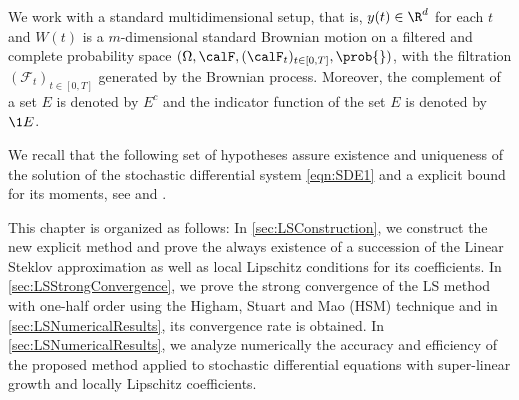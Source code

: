 We work with a standard multidimensional setup, that is,  $y(t)\in \R^d$ for each 
$t$ and  $W(t)$ is a
$m$-dimensional standard Brownian motion on a filtered and complete probability space
$	(
		\Omega ,\calF,(\calF_t)_{t\in[0,T]},\prob{}
	)$,
with the filtration
$(\mathcal{F}_t)_{t\in[0,T]}$  generated by the Brownian process.  Moreover, the complement of a set $E$ is denoted by 
$E^c$ and the indicator function  of the set $E$ is denoted by $\1{E}$. 


We recall that the following set of hypotheses assure existence 
and uniqueness of the solution of the stochastic differential system \eqref{eqn:SDE1} 
and a explicit bound for its moments, see  and .

	

	This chapter is organized as follows: In \cref{sec:LSConstruction}, we construct the new explicit method and prove 
the always existence of a succession of the Linear Steklov approximation as well as local Lipschitz conditions for
its coefficients.  In \cref{sec:LSStrongConvergence}, we prove the strong convergence of the LS method with one-half
order using the Higham, Stuart and Mao (HSM) technique and in \cref{sec:LSNumericalResults}, its convergence rate is 
obtained. In \cref{sec:LSNumericalResults}, we analyze numerically the accuracy and efficiency of 
the proposed method applied to stochastic differential equations with super-linear growth and locally Lipschitz 
coefficients. 



